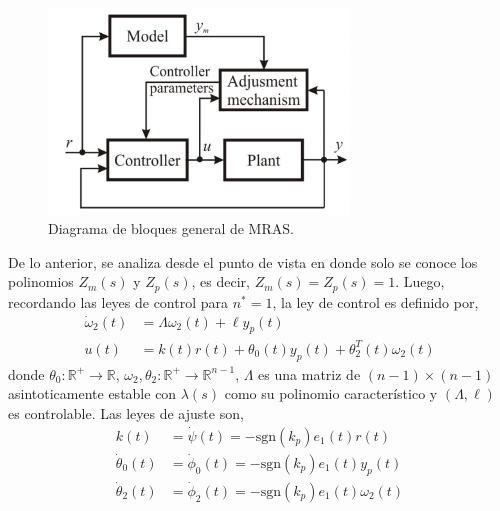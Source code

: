 \documentclass[letterpaper,11pt]{article} %
\begin{document}
\begin{figure}[h]
	\centering
	\includegraphics[width=8cm]{general.png}
	\caption{Diagrama de bloques general de MRAS.}
	\label{control}
\end{figure}
De lo anterior, se analiza desde el punto de vista en donde solo se conoce los polinomios $Z_m(s)$ y $Z_p(s)$, es decir, $Z_m(s) = Z_p(s) = 1$. Luego, recordando las leyes de control para $n^* = 1$, la ley de control es definido por,
\begin{align}
\dot{\omega}_2(t) &= \Lambda \omega_2(t) + \ell y_p(t) \nonumber\\
u(t) &= k(t)r(t) + \theta_0(t) y_p(t) + \theta_2^T (t) \omega_2(t) 
\label{ley de control}
\end{align}
donde $\theta_0: \mathbb{R}^+ \rightarrow \mathbb{R}$, $\omega_2, \theta_2: \mathbb{R}^+ \rightarrow \mathbb{R}^{n-1}$, $\Lambda$ es una matriz de $(n-1)\times(n-1)$ asintoticamente estable con $\lambda(s)$ como su polinomio característico y $(\Lambda, \ell)$ es controlable. Las leyes de ajuste son,
\begin{align}
	k(t)  &= \dot{\psi}(t) = -\mathrm{sgn}(k_p) e_1(t)r(t) \nonumber\\
	\dot{\theta}_0(t)  &= \dot{\phi}_0(t) = -\mathrm{sgn}(k_p) e_1(t) y_p(t) \nonumber\\
	\dot{\theta}_2(t) &= \dot{\phi}_2(t) = -\mathrm{sgn}(k_p) e_1(t) \omega_2(t) 
\end{align}
\end{document}
